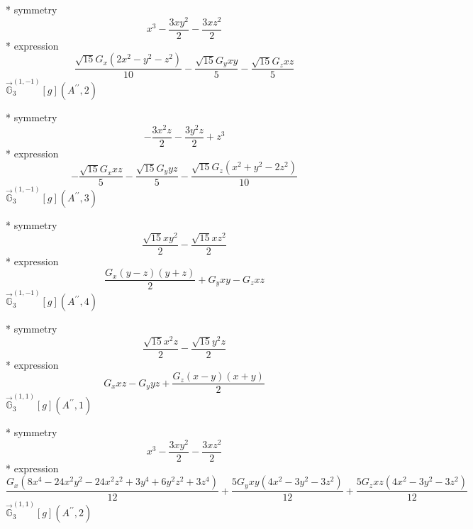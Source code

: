 \documentclass[fleqn,8pt]{jsarticle}
\begin{document}
\noindent\quad ** symmetry
\begin{dmath*}
x^{3} - \frac{3 x y^{2}}{2} - \frac{3 x z^{2}}{2}
\end{dmath*}
\noindent\quad ** expression
\begin{dmath*}
\frac{\sqrt{15} G_{x} \left(2 x^{2} - y^{2} - z^{2}\right)}{10} - \frac{\sqrt{15} G_{y} x y}{5} - \frac{\sqrt{15} G_{z} x z}{5}
\end{dmath*}
\noindent\quad $\vec{\mathbb{G}}_{3}^{(1,-1)}[g](A^{\prime\prime},2)$

\noindent\quad ** symmetry
\begin{dmath*}
- \frac{3 x^{2} z}{2} - \frac{3 y^{2} z}{2} + z^{3}
\end{dmath*}
\noindent\quad ** expression
\begin{dmath*}
- \frac{\sqrt{15} G_{x} x z}{5} - \frac{\sqrt{15} G_{y} y z}{5} - \frac{\sqrt{15} G_{z} \left(x^{2} + y^{2} - 2 z^{2}\right)}{10}
\end{dmath*}
\noindent\quad $\vec{\mathbb{G}}_{3}^{(1,-1)}[g](A^{\prime\prime},3)$

\noindent\quad ** symmetry
\begin{dmath*}
\frac{\sqrt{15} x y^{2}}{2} - \frac{\sqrt{15} x z^{2}}{2}
\end{dmath*}
\noindent\quad ** expression
\begin{dmath*}
\frac{G_{x} \left(y - z\right) \left(y + z\right)}{2} + G_{y} x y - G_{z} x z
\end{dmath*}
\noindent\quad $\vec{\mathbb{G}}_{3}^{(1,-1)}[g](A^{\prime\prime},4)$

\noindent\quad ** symmetry
\begin{dmath*}
\frac{\sqrt{15} x^{2} z}{2} - \frac{\sqrt{15} y^{2} z}{2}
\end{dmath*}
\noindent\quad ** expression
\begin{dmath*}
G_{x} x z - G_{y} y z + \frac{G_{z} \left(x - y\right) \left(x + y\right)}{2}
\end{dmath*}
\noindent\quad $\vec{\mathbb{G}}_{3}^{(1,1)}[g](A^{\prime\prime},1)$

\noindent\quad ** symmetry
\begin{dmath*}
x^{3} - \frac{3 x y^{2}}{2} - \frac{3 x z^{2}}{2}
\end{dmath*}
\noindent\quad ** expression
\begin{dmath*}
\frac{G_{x} \left(8 x^{4} - 24 x^{2} y^{2} - 24 x^{2} z^{2} + 3 y^{4} + 6 y^{2} z^{2} + 3 z^{4}\right)}{12} + \frac{5 G_{y} x y \left(4 x^{2} - 3 y^{2} - 3 z^{2}\right)}{12} + \frac{5 G_{z} x z \left(4 x^{2} - 3 y^{2} - 3 z^{2}\right)}{12}
\end{dmath*}
\noindent\quad $\vec{\mathbb{G}}_{3}^{(1,1)}[g](A^{\prime\prime},2)$
\end{document}
